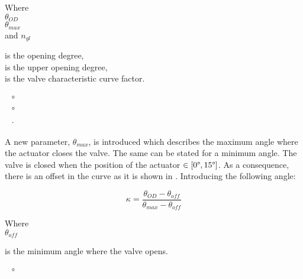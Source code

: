  \begin{minipage}[t]{0.20\textwidth}
Where\\
\hspace*{8mm} $\theta_{OD}$ \\
\hspace*{8mm} $\theta_{max}$ \\
and \hspace*{0.7mm} $n_{gl}$ 
\end{minipage}
\begin{minipage}[t]{0.68\textwidth}
\vspace*{2mm}
is the opening degree,\\ 
is the upper opening degree, \\
is the valve characteristic curve factor.
\end{minipage}
\begin{minipage}[t]{0.10\textwidth}
\vspace*{2mm}
\textcolor{White}{te}$\unit{\degree}$\\
\textcolor{White}{te}$\unit{\degree}$\\
\textcolor{White}{te}$\unit{\cdot}$
\end{minipage}	

A new parameter, $\theta_{max}$, is introduced which describes the maximum angle where the actuator closes the valve. The same can be stated for a minimum angle. The valve is closed when the position of the actuator $\in [0\degree,15\degree]$. As a consequence, there is an offset in the curve as it is shown in . Introducing the following angle:

\begin{equation}
\label{ValveAngle}
 \kappa =  \frac{\theta_{OD}-\theta_{off}}{\theta_{max}-\theta_{off}}
\end{equation}

  \begin{minipage}[t]{0.20\textwidth}
Where\\
\hspace*{8mm} $\theta_{off}$  
\end{minipage}
\begin{minipage}[t]{0.68\textwidth}
\vspace*{2mm}
is the minimum angle where the valve opens.

\end{minipage}
\begin{minipage}[t]{0.10\textwidth}
\vspace*{2mm}
\textcolor{White}{te}$\unit{\degree}$
\end{minipage}

